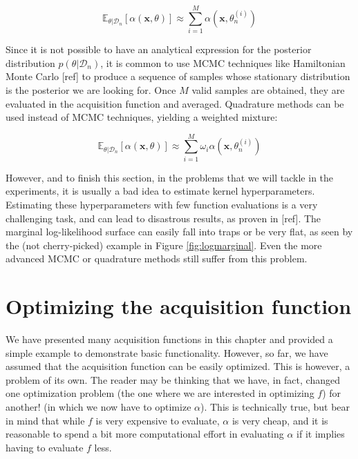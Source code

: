 \documentclass[10pt,a4paper,twoside]{book}
\begin{document}
\begin{equation}
\mathbb{E}_{\theta|\mathcal{D}_n}\left[ \alpha(\boldsymbol{x},\theta )\right] \approx \sum_{i=1}^M \alpha(\boldsymbol{x},\theta_n^{(i)})
\end{equation}

Since it is not possible to have an analytical expression for the posterior distribution $p(\theta|\mathcal{D}_n)$, it is common to use MCMC techniques like Hamiltonian Monte Carlo [ref] to produce a sequence of samples whose stationary distribution is the posterior we are looking for. Once $M$ valid samples are obtained, they are evaluated in the acquisition function and averaged. Quadrature methods can be used instead of MCMC techniques, yielding a weighted mixture:

\begin{equation}
\mathbb{E}_{\theta|\mathcal{D}_n}\left[ \alpha(\boldsymbol{x},\theta )\right] \approx \sum_{i=1}^M \omega_i \alpha(\boldsymbol{x},\theta_n^{(i)})
\end{equation}

However, and to finish this section, in the problems that we will tackle in the experiments, it is usually a bad idea to estimate kernel hyperparameters. Estimating these hyperparameters with few function evaluations is a very challenging task, and can lead to disastrous results, as proven in [ref]. The marginal log-likelihood surface can easily fall into traps or be very flat, as seen by the (not cherry-picked) example in Figure \ref{fig:logmarginal}. Even the more advanced MCMC or quadrature methods still suffer from this problem.

\section{Optimizing the acquisition function}

We have presented many acquisition functions in this chapter and provided a simple example to demonstrate basic functionality. However, so far, we have assumed that the acquisition function can be easily optimized. This is however, a problem of its own. The reader may be thinking that we have, in fact, changed one optimization problem (the one where we are interested in optimizing $f$) for another! (in which we now have to optimize $\alpha$). This is technically true, but bear in mind that while $f$ is very expensive to evaluate, $\alpha$ is very cheap, and it is reasonable to spend a bit more computational effort in evaluating $\alpha$ if it implies having to evaluate $f$ less.\\
\end{document}
